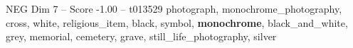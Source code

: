 \begin{textsample}{NEG Dim 7 – Score -1.00 – t013529}  \label{ex:f7_neg_015}
photograph, monochrome\_photography, cross, white, religious\_item, black, symbol, \textbf{monochrome}, black\_and\_white, grey, memorial, cemetery, grave, still\_life\_photography, silver

\end{textsample}
